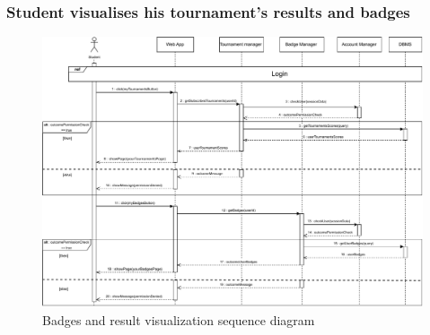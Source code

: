 \documentclass{article}
\begin{document}
{    \subsubsection{Student visualises his tournament's results and badges}
        \begin{figure}[H] 
            \centering
            \hspace*{-2.4cm}\includegraphics[scale=0.65]{Sequence/Sequence13DD.pdf}
            \caption{Badges and result visualization sequence diagram}
            \label{fig:Sequence13DD}
        \end{figure}

}
\end{document}
